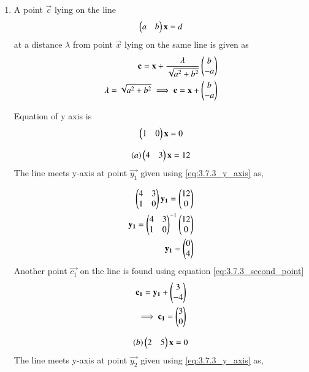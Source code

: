 \renewcommand{\theequation}{\theenumi}
\begin{enumerate}[label=\thesection.\arabic*.,ref=\thesection.\theenumi]
\item  A point $\vec{c}$ lying on the line 
\begin{align}
\begin{pmatrix}a&b\end{pmatrix}\mathbf{x} = d
\end{align}
at a distance $\lambda$ from point $\vec{x}$ lying on the same line is given as
\begin{align}
\mathbf{c} = \mathbf{x} + \frac{\lambda}{\sqrt{a^2+b^2}}\begin{pmatrix}b\\-a\end{pmatrix}
\\
\lambda=\sqrt{a^2+b^2}
\implies \mathbf{c} = \mathbf{x} + \begin{pmatrix}b\\-a\end{pmatrix}
\label{eq:3.7.3_second_point}
\end{align}


 Equation of y axis is 
\begin{align}
\begin{pmatrix}1&0\end{pmatrix}\mathbf{x}=0
\label{eq:3.7.3_y_axis}
\end{align}
 
\begin{align}
\left(a\right) \begin{pmatrix}4&3\end{pmatrix}\mathbf{x}=12
\end{align}
The line meets y-axis at point $\vec{y_1}$ given using \ref{eq:3.7.3_y_axis} as,
 
\begin{align}
\begin{pmatrix}4&3\\1&0\end{pmatrix}\mathbf{y_1} =\begin{pmatrix}12\\0\end{pmatrix}
\\
\mathbf{y_1}={\begin{pmatrix}4&3\\1&0\end{pmatrix}}^{-1}\begin{pmatrix}12\\0\end{pmatrix}
\\
\mathbf{y_1}=\begin{pmatrix}0\\4\end{pmatrix}
\end{align}
Another point $\vec{c_1}$ on the line is found using equation \ref{eq:3.7.3_second_point}
\begin{align}
\mathbf{c_1} = \mathbf{y_1} + \begin{pmatrix}3\\-4\end{pmatrix}
\\
\implies \mathbf{c_1} = \begin{pmatrix}3\\0\end{pmatrix}
\end{align}
\newline

\begin{align}
\left(b\right)\begin{pmatrix}2&5\end{pmatrix}\mathbf{x}=0
\end{align}
The line meets y-axis at point $\vec{y_2}$ given using \ref{eq:3.7.3_y_axis} as,
 

\end{enumerate}
